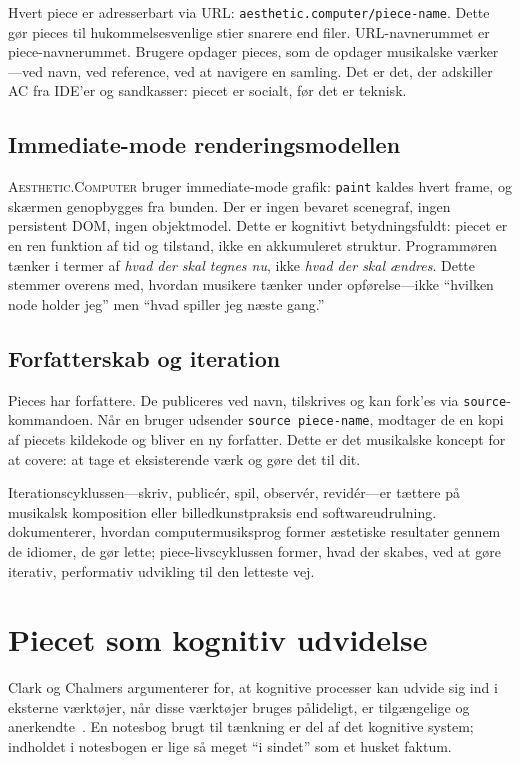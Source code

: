 \documentclass[10pt,letterpaper,twocolumn]{article}
\newcommand{\ac}{\textsc{Aesthetic.Computer}}
\begin{document}
Hvert piece er adresserbart via URL: \texttt{aesthetic.computer/piece-name}. Dette gør pieces til hukommelsesvenlige stier snarere end filer. URL-navnerummet er piece-navnerummet. Brugere opdager pieces, som de opdager musikalske værker---ved navn, ved reference, ved at navigere en samling. Det er det, der adskiller AC fra IDE'er og sandkasser: piecet er socialt, før det er teknisk.

\subsection{Immediate-mode renderingsmodellen}

\ac{} bruger immediate-mode grafik: \texttt{paint} kaldes hvert frame, og skærmen genopbygges fra bunden. Der er ingen bevaret scenegraf, ingen persistent DOM, ingen objektmodel. Dette er kognitivt betydningsfuldt: piecet er en ren funktion af tid og tilstand, ikke en akkumuleret struktur. Programmøren tænker i termer af \emph{hvad der skal tegnes nu}, ikke \emph{hvad der skal ændres}. Dette stemmer overens med, hvordan musikere tænker under opførelse---ikke ``hvilken node holder jeg'' men ``hvad spiller jeg næste gang.''

\subsection{Forfatterskab og iteration}

Pieces har forfattere. De publiceres ved navn, tilskrives og kan fork'es via \texttt{source}-kommandoen. Når en bruger udsender \texttt{source piece-name}, modtager de en kopi af piecets kildekode og bliver en ny forfatter. Dette er det musikalske koncept for at covere: at tage et eksisterende værk og gøre det til dit.

Iterationscyklussen---skriv, publicér, spil, observér, revidér---er tættere på musikalsk komposition eller billedkunstpraksis end softwareudrulning. \citet{mcpherson2020idiomatic} dokumenterer, hvordan computermusiksprog former æstetiske resultater gennem de idiomer, de gør lette; piece-livscyklussen former, hvad der skabes, ved at gøre iterativ, performativ udvikling til den letteste vej.

\section{Piecet som kognitiv udvidelse}

Clark og Chalmers argumenterer for, at kognitive processer kan udvide sig ind i eksterne værktøjer, når disse værktøjer bruges pålideligt, er tilgængelige og anerkendte~\citep{clark1998extended}. En notesbog brugt til tænkning er del af det kognitive system; indholdet i notesbogen er lige så meget ``i sindet'' som et husket faktum.
\end{document}
